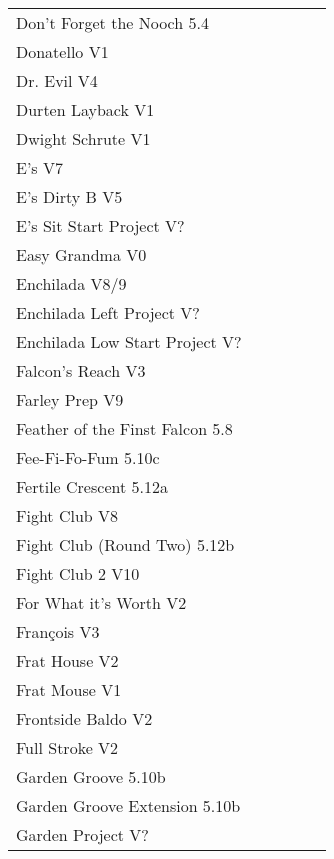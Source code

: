 \begin{flushleft}
\begin{center}
\begin{supertabular}{p{0.76\linewidth}p{0.08\linewidth}}
Don't Forget the Nooch 5.4 & \pageref{rt:Don't Forget the Nooch} \\
Donatello V1 & \pageref{rt:Donatello} \\
Dr. Evil V4 & \pageref{rt:Dr. Evil} \\
Durten Layback V1 & \pageref{rt:Durten Layback} \\
Dwight Schrute V1 & \pageref{rt:Dwight Schrute} \\
E's V7 & \pageref{rt:E's} \\
E's Dirty B V5 & \pageref{rt:E's Dirty B} \\
E's Sit Start Project V? & \pageref{vr:E's Sit Start Project} \\
Easy Grandma V0 & \pageref{rt:Easy Grandma} \\
Enchilada V8/9 & \pageref{rt:Enchilada} \\
Enchilada Left Project V? & \pageref{vr:Enchilada Left Project} \\
Enchilada Low Start Project V? & \pageref{vr:Enchilada Low Start Project} \\
Falcon's Reach V3 & \pageref{rt:Falcon's Reach} \\
Farley Prep V9 & \pageref{rt:Farley Prep} \\
Feather of the Finst Falcon 5.8 & \pageref{rt:Feather of the Finst Falcon} \\
Fee-Fi-Fo-Fum 5.10c & \pageref{rt:Fee-Fi-Fo-Fum} \\
Fertile Crescent 5.12a & \pageref{rt:Fertile Crescent} \\
Fight Club V8 & \pageref{rt:Fight Club} \\
Fight Club (Round Two) 5.12b & \pageref{rt:Fight Club (Round Two)} \\
Fight Club 2 V10 & \pageref{rt:Fight Club 2} \\
For What it's Worth V2 & \pageref{rt:For What it's Worth} \\
François V3 & \pageref{rt:François} \\
Frat House V2 & \pageref{rt:Frat House} \\
Frat Mouse V1 & \pageref{rt:Frat Mouse} \\
Frontside Baldo V2 & \pageref{rt:Frontside Baldo} \\
Full Stroke V2 & \pageref{rt:Full Stroke} \\
Garden Groove 5.10b & \pageref{rt:Garden Groove} \\
Garden Groove Extension 5.10b & \pageref{vr:Garden Groove Extension} \\
Garden Project V? & \pageref{rt:Garden Project} \\

\end{supertabular}
\end{center}
\end{flushleft}
